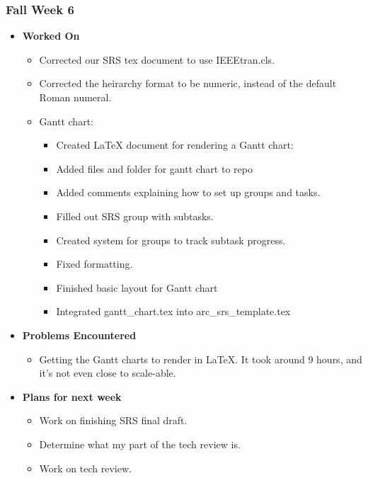 \documentclass[compsoc,draftclsnofoot,onecolumn,10pt]{IEEEtran}
\begin{document}
\subsubsection{Fall Week 6}
\begin{itemize}
    \item {\textbf{Worked On}}
    \begin{itemize}
        \item Corrected our SRS tex document to use IEEEtran.cls.
        \item Corrected the heirarchy format to be numeric, instead of the default Roman numeral.
        \item Gantt chart:
        \begin{itemize}
            \item Created LaTeX document for rendering a Gantt chart:
            \item Added files and folder for gantt chart to repo
            \item Added comments explaining how to set up groups and tasks.
            \item Filled out SRS group with subtasks.
            \item Created system for groups to track subtask progress.
            \item Fixed formatting.
            \item Finished basic layout for Gantt chart
            \item Integrated gantt\_chart.tex into arc\_srs\_template.tex
        \end{itemize}
    \end{itemize}

    \item {\textbf{Problems Encountered}}
    \begin{itemize}
        \item Getting the Gantt charts to render in LaTeX. It took around 9 hours, and it's not even close to scale-able.
    \end{itemize}

    \item{\textbf{Plans for next week}}
    \begin{itemize}
        \item Work on finishing SRS final draft.
        \item Determine what my part of the tech review is.
        \item Work on tech review.
    \end{itemize}
\end{itemize}
\end{document}
